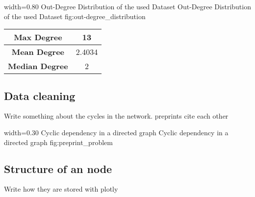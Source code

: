       {width=0.80\textwidth}
      {Out-Degree Distribution of the used Dataset}
      {Out-Degree Distribution of the used Dataset}
      {fig:out-degree_distribution}

    \begin{center}
      \begin{tabular}{ | c | c | }
        \hline
        \textbf{Max Degree} & 13 \\ \hline
        \textbf{Mean Degree} & 2.4034 \\ \hline
        \textbf{Median Degree} & 2 \\ \hline
      \end{tabular}
    \end{center}

\subsection{Data cleaning}
\label{subsec:data_cleaning}
Write something about the cycles in the network. preprints cite each other

      {width=0.30\textwidth}
      {Cyclic dependency in a directed graph}
      {Cyclic dependency in a directed graph}
      {fig:preprint_problem}


\subsection{Structure of an node}
\label{sec:analysis}
Write how they are stored with plotly
